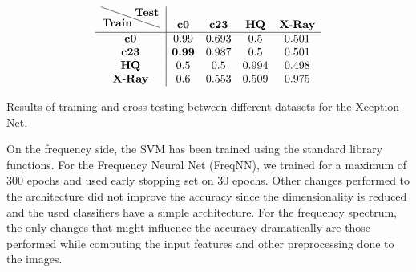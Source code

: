 \documentclass[11pt]{article}
\begin{document}
\begin{table}
\[\begin{array}{c|cccc}
\tikz{\node[below left, inner sep=1pt] (def) {\textbf{Train}};%
      \node[above right,inner sep=1pt] (abc) {\textbf{Test}};%
      \draw (def.north west|-abc.north west) -- (def.south east-|abc.south east);}
 & \textbf{c0} & \textbf{c23} & \textbf{HQ} & \textbf{X\textnormal{-}Ray}\\
\hline
\textbf{c0} & 0.99 & 0.693 & 0.5 & 0.501\\
\textbf{c23} & \textbf{0.99} & 0.987 & 0.5 & 0.501\\
\textbf{HQ} & 0.5 & 0.5 & 0.994 & 0.498\\
\textbf{X\textnormal{-}Ray} & 0.6 & 0.553 & 0.509 & 0.975\\
\end{array}\]
\caption{\label{tb:xception-cross}
Results of training and cross-testing between different datasets for the Xception Net.
}
\end{table}


On the frequency side, the SVM has been trained using the standard library functions. For the Frequency Neural Net (FreqNN), we trained for a maximum of 300 epochs and used early stopping set on 30 epochs. Other changes performed to the architecture did not improve the accuracy since the dimensionality is reduced and the used classifiers have a simple architecture. For the frequency spectrum, the only changes that might influence the accuracy dramatically are those performed while computing the input features and other preprocessing done to the images. 
\end{document}
